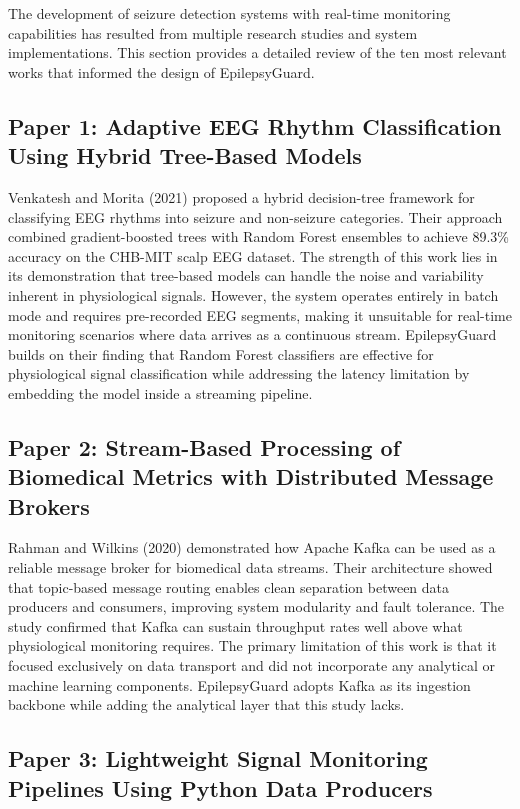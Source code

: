 \documentclass[12pt, a4paper, oneside]{report}
\begin{document}
The development of seizure detection systems with real-time monitoring capabilities has resulted from multiple research studies and system implementations. This section provides a detailed review of the ten most relevant works that informed the design of EpilepsyGuard.

\subsection{Paper 1: Adaptive EEG Rhythm Classification Using Hybrid Tree-Based Models}

Venkatesh and Morita (2021) proposed a hybrid decision-tree framework for classifying EEG rhythms into seizure and non-seizure categories. Their approach combined gradient-boosted trees with Random Forest ensembles to achieve 89.3\% accuracy on the CHB-MIT scalp EEG dataset. The strength of this work lies in its demonstration that tree-based models can handle the noise and variability inherent in physiological signals. However, the system operates entirely in batch mode and requires pre-recorded EEG segments, making it unsuitable for real-time monitoring scenarios where data arrives as a continuous stream. EpilepsyGuard builds on their finding that Random Forest classifiers are effective for physiological signal classification while addressing the latency limitation by embedding the model inside a streaming pipeline.

\subsection{Paper 2: Stream-Based Processing of Biomedical Metrics with Distributed Message Brokers}

Rahman and Wilkins (2020) demonstrated how Apache Kafka can be used as a reliable message broker for biomedical data streams. Their architecture showed that topic-based message routing enables clean separation between data producers and consumers, improving system modularity and fault tolerance. The study confirmed that Kafka can sustain throughput rates well above what physiological monitoring requires. The primary limitation of this work is that it focused exclusively on data transport and did not incorporate any analytical or machine learning components. EpilepsyGuard adopts Kafka as its ingestion backbone while adding the analytical layer that this study lacks.

\subsection{Paper 3: Lightweight Signal Monitoring Pipelines Using Python Data Producers}
\end{document}
